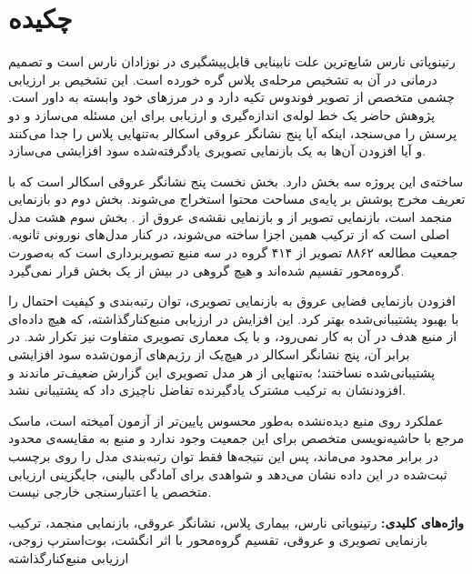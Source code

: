 \section*{چکیده}

رتینوپاتی نارس شایع‌ترین علت نابینایی قابل‌پیشگیری در نوزادان نارس است و تصمیم درمانی در آن به تشخیص مرحله‌ی پلاس گره خورده است. این تشخیص بر ارزیابی چشمی متخصص از تصویر فوندوس تکیه دارد و در مرزهای خود وابسته به داور است. پژوهش حاضر یک خط لوله‌ی اندازه‌گیری و ارزیابی برای این مسئله می‌سازد و دو پرسش را می‌سنجد، اینکه آیا پنج نشانگر عروقی اسکالر به‌تنهایی پلاس را جدا می‌کنند و آیا افزودن آن‌ها به یک بازنمایی تصویری یادگرفته‌شده سود افزایشی می‌سازد.

ساخته‌ی این پروژه سه بخش دارد. بخش نخست پنج نشانگر عروقی اسکالر است که با تعریف مخرج پوشش بر پایه‌ی مساحت محتوا استخراج می‌شوند. بخش دوم دو بازنمایی منجمد است، بازنمایی تصویر  از  و بازنمایی نقشه‌ی عروق از . بخش سوم هشت مدل اصلی است که از ترکیب همین اجزا ساخته می‌شوند، در کنار مدل‌های نورونی ثانویه. جمعیت مطالعه ۸۸۶۲ تصویر از ۴۱۴ گروه در سه منبع تصویربرداری است که به‌صورت گروه‌محور تقسیم شده‌اند و هیچ گروهی در بیش از یک بخش قرار نمی‌گیرد.

افزودن بازنمایی فضایی عروق به بازنمایی تصویری، توان رتبه‌بندی و کیفیت احتمال را با بهبود پشتیبانی‌شده بهتر کرد. این افزایش در ارزیابی منبع‌کنارگذاشته، که هیچ داده‌ای از منبع هدف در آن به کار نمی‌رود، و با یک معماری تصویری متفاوت نیز تکرار شد. در برابر آن، پنج نشانگر اسکالر در هیچ‌یک از رژیم‌های آزمون‌شده سود افزایشی پشتیبانی‌شده نساختند؛ به‌تنهایی از هر مدل تصویری این گزارش ضعیف‌تر ماندند و افزودنشان به ترکیب مشترک یادگیرنده تفاضل ناچیزی داد که پشتیبانی نشد.

عملکرد روی منبع دیده‌نشده به‌طور محسوس پایین‌تر از آزمون آمیخته است، ماسک مرجع با حاشیه‌نویسی متخصص برای این جمعیت وجود ندارد و منبع  به مقایسه‌ی محدود  در برابر  محدود می‌ماند، پس این نتیجه‌ها فقط توان رتبه‌بندی مدل را روی برچسب ثبت‌شده در این داده نشان می‌دهد و شواهدی برای آمادگی بالینی، جایگزینی ارزیابی متخصص یا اعتبارسنجی خارجی نیست.

\vspace{0.4cm}
\noindent\textbf{واژه‌های کلیدی:}
رتینوپاتی نارس، بیماری پلاس، نشانگر عروقی، بازنمایی منجمد، ترکیب بازنمایی تصویری و عروقی،
تقسیم گروه‌محور با اثر انگشت، بوت‌استرپ زوجی، ارزیابی منبع‌کنارگذاشته


\clearpage
